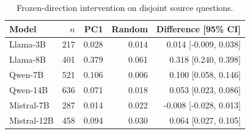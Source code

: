 \begin{table}[H]
\centering
\small
\setlength{\tabcolsep}{2pt}
\caption{Frozen-direction intervention on disjoint source questions.}
\label{tab:frozen-controls}
\begin{tabular*}{\linewidth}{@{\extracolsep{\fill}}lrrrr@{}}
\toprule
Model & $n$ & PC1 & Random & Difference [95\% CI] \\
\midrule
Llama-3B & 217 & 0.028 & 0.014 & 0.014 [-0.009, 0.038] \\
Llama-8B & 401 & 0.379 & 0.061 & 0.318 [0.240, 0.398] \\
Qwen-7B & 521 & 0.106 & 0.006 & 0.100 [0.058, 0.146] \\
Qwen-14B & 636 & 0.071 & 0.018 & 0.053 [0.023, 0.086] \\
Mistral-7B & 287 & 0.014 & 0.022 & -0.008 [-0.028, 0.013] \\
Mistral-12B & 458 & 0.094 & 0.030 & 0.064 [0.027, 0.105] \\
\bottomrule
\end{tabular*}
\end{table}
